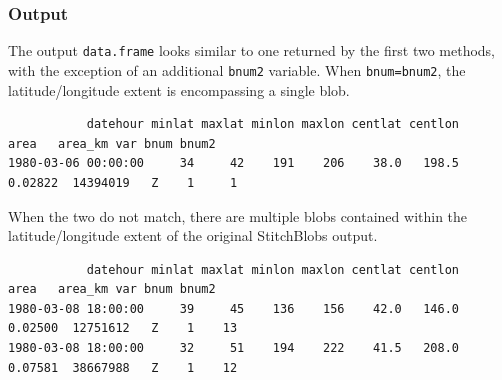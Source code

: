 \documentclass{article}
\begin{document}
%
%
%

\subsubsection{Output}

The output \texttt{data.frame} looks similar to one returned by the first two methods, with the exception of an additional \texttt{bnum2} variable. When \texttt{bnum=bnum2}, the latitude/longitude extent is encompassing a single blob.

\begin{verbatim}
           datehour minlat maxlat minlon maxlon centlat centlon    area   area_km var bnum bnum2
1980-03-06 00:00:00     34     42    191    206    38.0   198.5 0.02822  14394019   Z    1     1
\end{verbatim}

When the two do not match, there are multiple blobs contained within the latitude/longitude extent of the original StitchBlobs output.

\begin{verbatim}
           datehour minlat maxlat minlon maxlon centlat centlon    area   area_km var bnum bnum2
1980-03-08 18:00:00     39     45    136    156    42.0   146.0 0.02500  12751612   Z    1    13
1980-03-08 18:00:00     32     51    194    222    41.5   208.0 0.07581  38667988   Z    1    12
\end{verbatim}
\end{document}
